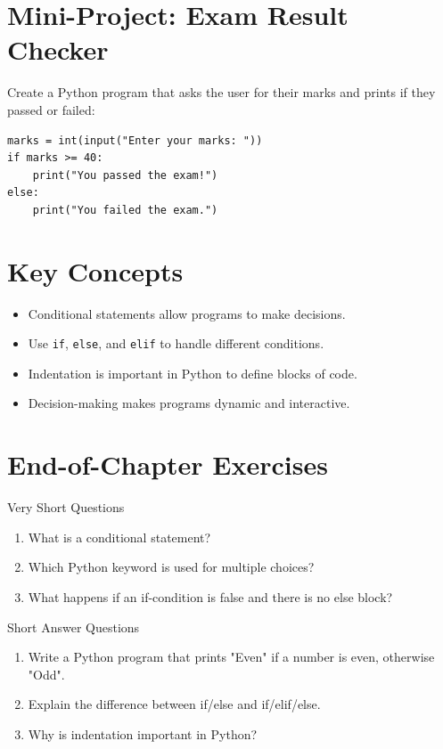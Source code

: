 \section{Mini-Project: Exam Result Checker}

Create a Python program that asks the user for their marks and prints if they passed or failed:

\begin{verbatim}
marks = int(input("Enter your marks: "))
if marks >= 40:
    print("You passed the exam!")
else:
    print("You failed the exam.")
\end{verbatim}

\section{Key Concepts}

\begin{itemize}
    \item Conditional statements allow programs to make decisions.
    \item Use \texttt{if}, \texttt{else}, and \texttt{elif} to handle different conditions.
    \item Indentation is important in Python to define blocks of code.
    \item Decision-making makes programs dynamic and interactive.
\end{itemize}

\section{End-of-Chapter Exercises}

\begin{exercise}{Very Short Questions}
\begin{enumerate}
    \item What is a conditional statement?
    \item Which Python keyword is used for multiple choices?
    \item What happens if an if-condition is false and there is no else block?
\end{enumerate}
\end{exercise}

\begin{exercise}{Short Answer Questions}
\begin{enumerate}
    \item Write a Python program that prints "Even" if a number is even, otherwise "Odd".
    \item Explain the difference between if/else and if/elif/else.
    \item Why is indentation important in Python?
\end{enumerate}
\end{exercise}

